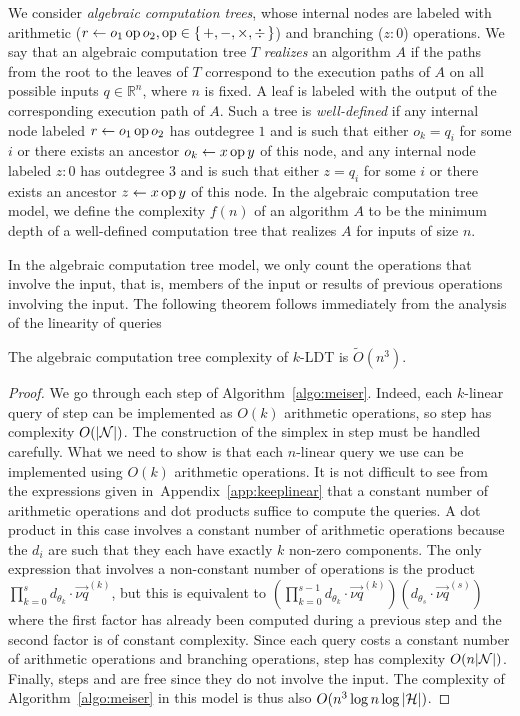 We consider \emph{algebraic computation trees}, whose internal nodes
are labeled with arithmetic (\(r \gets o_1 \operatorname{op} o_2, \operatorname{op} \in
\{\,+,-,\times,\div\,\}\)) and branching (\(z : 0\)) operations. We say that an
algebraic computation tree $T$ \emph{realizes} an algorithm $A$ if the paths
from the root to the leaves of $T$ correspond to the execution paths of \(A\)
on all possible inputs \(q \in \mathbb{R}^n\), where \(n\) is fixed. A leaf is
labeled with the output of the corresponding execution path of \(A\). Such a
tree is \emph{well-defined} if any internal node labeled \(r \gets o_1 \operatorname{op}
o_2\) has outdegree \(1\) and is such that either \(o_k = q_i\) for some \(i\)
or there exists an ancestor \(o_k \gets x \operatorname{op} y\) of this node, and any
internal node labeled \(z : 0\) has outdegree \(3\) and is such that either \(z
= q_i\) for some \(i\) or there exists an ancestor \(z \gets x \operatorname{op} y\) of this
node. In the algebraic computation tree model, we define the complexity
\(f(n)\) of an algorithm $A$ to be the minimum depth of a well-defined
computation tree that realizes $A$ for inputs of size $n$.

In the algebraic computation tree model, we only count the operations that
involve the input, that is, members of the input or results of previous
operations involving the input. The following theorem follows immediately from
the analysis of the linearity of queries
\begin{theorem}\label{thm:act}
	The algebraic computation tree complexity of \(k\)-LDT is
	\(\tilde{O}(n^3)\).
\end{theorem}

\begin{proof}
We go through each step of Algorithm~\ref{algo:meiser}.
Indeed, each \(k\)-linear query of step  can be implemented as
\(O(k)\) arithmetic operations, so step  has complexity
\(O(|{\mathcal{N}}|)\).
The construction of the simplex in step  must be handled carefully.
What we need to show is that each \(n\)-linear query we use can be implemented
using $O(k)$ arithmetic operations. It is not difficult to see from the
expressions given in~Appendix~\ref{app:keeplinear} that a constant number of arithmetic
operations and dot products suffice to
compute the queries. A dot product in this case involves a constant number
of arithmetic operations because the \(d_i\) are such that they each have
exactly \(k\) non-zero components. The only expression that involves a
non-constant number of operations is the product \(\prod_{k=0}^{s}
d_{\theta_{k}} \cdot \vec{\nu q}^{(k)}\), but this is equivalent to
\((\prod_{k=0}^{s-1}
	d_{\theta_{k}} \cdot \vec{\nu q}^{(k)})(d_{\theta_{s}} \cdot
	\vec{\nu q}^{(s)})\)
where the first factor has already been computed during a previous step and
the second factor is of constant complexity. Since each query costs a constant
number of arithmetic operations and branching operations, step 
has complexity \(O(n|{\mathcal{N}}|)\).
Finally, steps  and  are free since they do not involve the
input. The complexity of Algorithm~\ref{algo:meiser} in this model is thus also \(O(n^3
\log n \log |{\mathcal{H}}|)\).
\end{proof}

